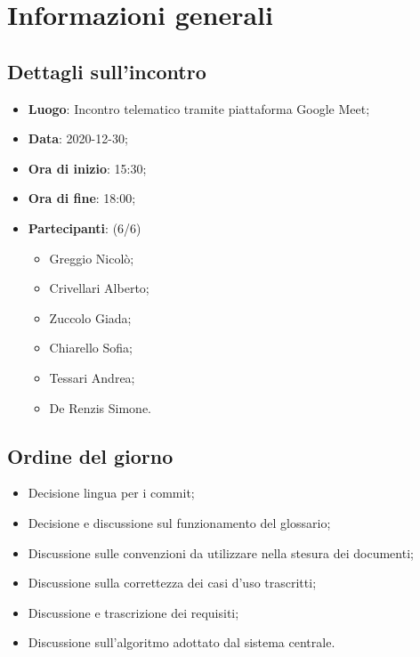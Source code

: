 \section{Informazioni generali}

\subsection{Dettagli sull'incontro}
\begin{itemize}
\item \textbf{Luogo}: Incontro telematico tramite piattaforma Google Meet;
\item \textbf{Data}: 2020-12-30;
\item \textbf{Ora di inizio}: 15:30;
\item \textbf{Ora di fine}: 18:00;
\item \textbf{Partecipanti}: (6/6) 
\begin{itemize}
	\item Greggio Nicolò;
	\item Crivellari Alberto;
	\item Zuccolo Giada;
	\item Chiarello Sofia;
	\item Tessari Andrea;
	\item De Renzis Simone.
\end{itemize}
\end{itemize}

\subsection{Ordine del giorno}
\begin{itemize}
	\item Decisione lingua per i commit;
	\item Decisione e discussione sul funzionamento del glossario;
	\item Discussione sulle convenzioni da utilizzare nella stesura dei documenti;
	\item Discussione sulla correttezza dei casi d'uso trascritti;
	\item Discussione e trascrizione dei requisiti;
	\item Discussione sull'algoritmo adottato dal sistema centrale.

\end{itemize}


